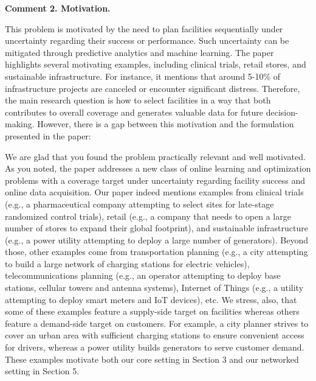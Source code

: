 \documentclass[11pt]{article}
\begin{document}
\begin{commentBox}
    \textbf{Comment 2. Motivation.}\label{R2:2}

    This problem is motivated by the need to plan facilities sequentially under uncertainty regarding their success or performance. Such uncertainty can be mitigated through predictive analytics and machine learning. The paper highlights several motivating examples, including clinical trials, retail stores, and sustainable infrastructure. For instance, it mentions that around 5-10\% of infrastructure projects are canceled or encounter significant distress. Therefore, the main research question is how to select facilities in a way that both contributes to overall coverage and generates valuable data for future decision-making. However, there is a gap between this motivation and the formulation presented in the paper:
\end{commentBox}

We are glad that you found the problem practically relevant and well motivated. As you noted, the paper addresses a new class of online learning and optimization problems with a coverage target under uncertainty regarding facility success and online data acquisition. Our paper indeed mentions examples from clinical trials (e.g., a pharmaceutical company attempting to select sites for late-stage randomized control trials), retail (e.g., a company that needs to open a large number of stores to expand their global footprint), and sustainable infrastructure (e.g., a power utility attempting to deploy a large number of generators). Beyond those, other examples come from transportation planning (e.g., a city attempting to build a large network of charging stations for electric vehicles), telecommunications planning (e.g., an operator attempting to deploy base stations, cellular towers and antenna systems), Internet of Things (e.g., a utility attempting to deploy smart meters and IoT devices), etc. We stress, also, that some of these examples feature a supply-side target on facilities whereas others feature a demand-side target on customers. For example, a city planner strives to cover an urban area with sufficient charging stations to ensure convenient access for drivers, whereas a power utility builds generators to serve customer demand. These examples motivate both our core setting in Section 3 and our networked setting in Section 5.
\end{document}
